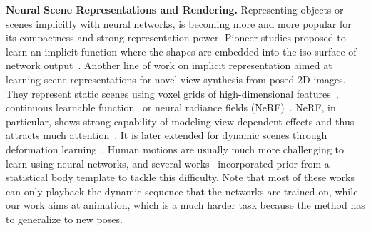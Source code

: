 \textbf{Neural Scene Representations and Rendering.} 
Representing objects or scenes implicitly with neural networks, is becoming more and more popular for its compactness and strong representation power. Pioneer studies proposed to learn an implicit function where the shapes are embedded into the iso-surface of network output~\cite{park2019deepsdf,chen2019implicit,Occupancy_Networks,zheng2021dit,Genova2020Local,Bozic2021NeuralDeformationGraph,deng2019NASA}. Another line of work on implicit representation aimed at learning scene representations for novel view synthesis from posed 2D images. They represent static scenes using voxel grids of high-dimensional features~\cite{sitzmann2019deepvoxels}, continuous learnable function~\cite{sitzmann2019srns} or neural radiance fields (NeRF)~\cite{mildenhall2020nerf}. NeRF, in particular, shows strong capability of modeling view-dependent effects and thus attracts much attention~\cite{liu2020nsvf,MartinBrualla20arxiv_nerfw,Zhang20arxiv_nerf++,reiser2021kilonerf,yu2021plenoctrees,Garbin21arxiv_FastNeRF,Lombardi2021MVP}. It is later extended for dynamic scenes through deformation learning~\cite{Park20arxiv_nerfies,Pumarola20arxiv_D_NeRF,Gafni20arxiv_DNRF,Tretschk20arxiv_NR-NeRF,Li20arxiv_nsff,Xian20arxiv_stnif,Gao-freeviewvideo,li2021neural3dvideo,shao2022doublefield}. Human motions are usually much more challenging to learn using neural networks, and several works~\cite{peng2021neuralbody,noguchi2021narf,kwon2021neural} incorporated prior from a statistical body template to tackle this difficulty. Note that most of these works can only playback the dynamic sequence that the networks are trained on, while our work aims at animation, which is a much harder task because the method has to generalize to new poses.


